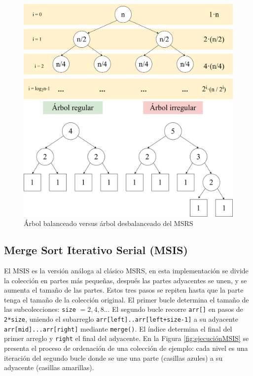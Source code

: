 \documentclass[titlepage]{article}
\begin{document}
\begin{figure}[h]
\centering 
\captionsetup{justification=centering, margin=10pt}
\begin{minipage}{0.5\textwidth} 
    \centering 
    \includegraphics[width=0.95\linewidth]{Diagrames/arbolBinarioLenght.png} 
    \caption{Tamaño de la entrada a lo largo de las llamadas a \lstinline{sort()}} 
    \label{fig:entradaMSRS}
\end{minipage}\hfill 
\begin{minipage}{0.5\textwidth} 
    \centering 
    \includegraphics[width=0.95\linewidth]{Diagrames/arbolBinario_MSRS.png} 
    \caption{Árbol balanceado versus árbol desbalanceado del MSRS} 
    \label{fig:simetriaMSRS}
\end{minipage} 
\end{figure}


\subsection{Merge Sort Iterativo Serial (MSIS)} %

El MSIS es la versión análoga al clásico MSRS, en esta implementación se divide la colección en partes más pequeñas, después las partes adyacentes se unen, y se aumenta el tamaño  de las partes. Estos tres pasos se repiten hasta que la parte tenga el tamaño de la colección original. El primer bucle determina el tamaño de las subcolecciones: \lstinline|size| \(=2, 4, 8..\). El segundo bucle recorre \lstinline|arr[]| en pasos de \lstinline|2*size|, uniendo el subarreglo \lstinline|arr[left]..arr[left+size-1]| a su adyacente \lstinline|arr[mid]...arr[right]| mediante \lstinline|merge()|. El índice  determina el final del primer arreglo y \lstinline|right| el final del adyacente. En la Figura \ref{fig:ejecuciónMSIS} se presenta el proceso de ordenación de una colección de ejemplo: cada nivel es una iteración del segundo bucle donde se une una parte (casillas azules) a su adyacente (casillas amarillas).
\end{document}
